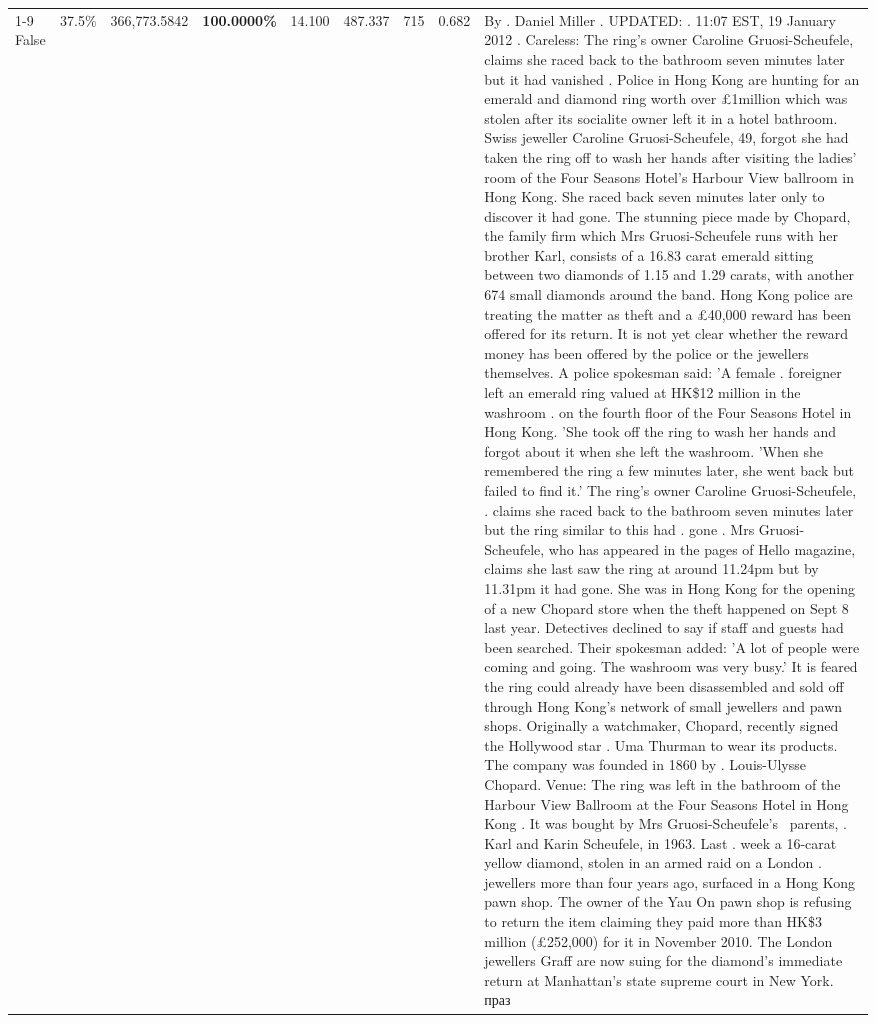 \begin{table}[H]
\begin{tabular}{lllrlllll}
\cline{1-9}
False & 37.5\% & 366,773.5842 & \bfseries \color{red} 100.0000\% & 14.100 & 487.337 & 715 & 0.682 & By . Daniel Miller . UPDATED: . 11:07 EST, 19 January 2012 . Careless: The ring's owner Caroline Gruosi-Scheufele, claims she raced back to the bathroom seven minutes later but it had vanished . Police in Hong Kong are hunting for an emerald and diamond ring worth over £1million which was stolen after its socialite owner left it in a hotel bathroom. Swiss jeweller Caroline Gruosi-Scheufele, 49, forgot she had taken the ring off to wash her hands after visiting the ladies' room of the Four Seasons Hotel's Harbour View ballroom in Hong Kong. She raced back seven minutes later only to discover it had gone. The stunning piece made by Chopard, the family firm which Mrs Gruosi-Scheufele runs with her brother Karl, consists of a 16.83 carat emerald sitting between two diamonds of 1.15 and 1.29 carats, with another 674 small diamonds around the band. Hong Kong police are treating the matter as theft and a £40,000 reward has been offered for its return. It is not yet clear whether the reward money has been offered by the police or the jewellers themselves. A police spokesman said: 'A female . foreigner left an emerald ring valued at HK\$12 million in the washroom . on the fourth floor of the Four Seasons Hotel in Hong Kong. 'She took off the ring to wash her hands and forgot about it when she left the washroom. 'When she remembered the ring a few minutes later, she went back but failed to find it.' The ring's owner Caroline Gruosi-Scheufele, . claims she raced back to the bathroom seven minutes later but the ring similar to this had . gone . Mrs Gruosi-Scheufele, who has appeared in the pages of Hello magazine, claims she last saw the ring at around 11.24pm but by 11.31pm it had gone. She was in Hong Kong for the opening of a new Chopard store when the theft happened on Sept 8 last year. Detectives declined to say if staff and guests had been searched. Their spokesman added: 'A lot of people were coming and going. The washroom was very busy.' It is feared the ring could already have been disassembled and sold off through Hong Kong's network of small jewellers and pawn shops. Originally a watchmaker, Chopard, recently signed the Hollywood star . Uma Thurman to wear its products. The company was founded in 1860 by . Louis-Ulysse Chopard. Venue: The ring was left in the bathroom of the Harbour View Ballroom at the Four Seasons Hotel in Hong Kong . It was bought by Mrs Gruosi-Scheufele's  parents, . Karl and Karin Scheufele, in 1963. Last . week a 16-carat yellow diamond, stolen in an armed raid on a London . jewellers more than four years ago, surfaced in a Hong Kong pawn shop. The owner of the Yau On pawn shop is refusing to return the item claiming they paid more than HK\$3 million (£252,000) for it in November 2010. The London jewellers Graff are now suing for the diamond’s immediate return at Manhattan’s state supreme court in New York. праз \\

\end{tabular}
\end{table}
